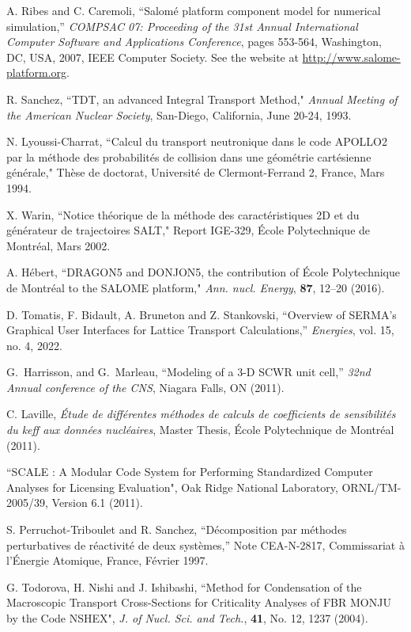 \begin{thebibliography}{99}
A. Ribes and C. Caremoli, ``Salom\'e platform component model for numerical simulation,'' {\sl COMPSAC 07: Proceeding of the 31st Annual International Computer Software and Applications Conference}, pages 553-564, Washington, DC, USA, 2007, IEEE Computer Society.
See the website at \url{http://www.salome-platform.org}.

R. Sanchez, ``TDT, an advanced Integral Transport Method," {\sl Annual Meeting of the American Nuclear Society}, San-Diego, California, June 20-24, 1993.

N. Lyoussi-Charrat, ``Calcul du transport neutronique dans le code APOLLO2 par la m\'ethode des probabilit\'es de
collision dans une g\'eom\'etrie cart\'esienne g\'en\'erale," Th\`ese de doctorat, Universit\'e de Clermont-Ferrand 2, France,
Mars 1994.

X. Warin, ``Notice th\'eorique de la m\'ethode des caract\'eristiques 2D et du g\'en\'erateur de trajectoires SALT," Report IGE-329, \'Ecole Polytechnique de Montr\'eal, Mars 2002.

A. H\'ebert, ``DRAGON5 and DONJON5, the contribution of \'Ecole Polytechnique de Montr\'eal to the SALOME platform," {\sl Ann. nucl. Energy}, {\bf 87}, 12--20 (2016).

D. Tomatis, F. Bidault, A. Bruneton and Z. Stankovski, ``Overview of SERMA's Graphical  User Interfaces for Lattice Transport Calculations,'' {\sl Energies}, vol. 15, no. 4, 2022.

 G.~Harrisson, and G.~Marleau, ``Modeling of a {3-D} {SCWR} unit cell,''
  {\sl 32nd Annual conference of the CNS}, Niagara Falls, ON (2011).

C. Laville, {\sl \'Etude de diff\'erentes m\'ethodes de calculs de coefficients de
sensibilit\'es du keff aux donn\'ees nucl\'eaires}, Master Thesis, \'Ecole Polytechnique de Montr\'eal (2011).

``SCALE : A Modular Code System for Performing Standardized Computer Analyses for Licensing Evaluation",
Oak Ridge National Laboratory, ORNL/TM-2005/39, Version 6.1 (2011).

S. Perruchot-Triboulet and R. Sanchez, ``D\'ecomposition par m\'ethodes perturbatives de r\'eactivit\'e de deux syst\`emes,'' Note CEA-N-2817, Commissariat \`a l'\'Energie Atomique, France, F\'evrier 1997.

G. Todorova, H. Nishi and J. Ishibashi, ``Method for Condensation of the Macroscopic Transport Cross-Sections for Criticality Analyses of FBR MONJU by the Code NSHEX", {\sl J. of Nucl. Sci. and Tech.},
{\bf 41}, No. 12, 1237 (2004).


\end{thebibliography}
